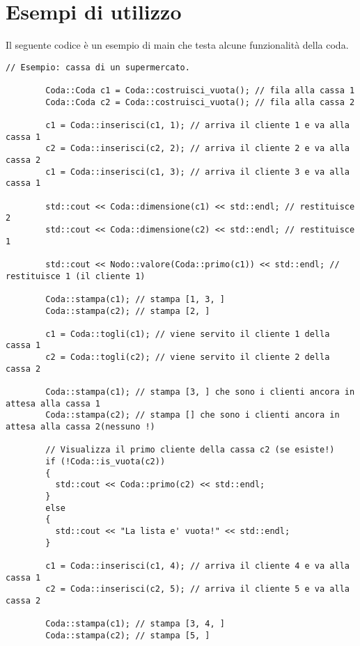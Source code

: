 \documentclass[addpoints,12pt,answers]{exam}
\begin{document}
    \section{Esempi di utilizzo}

    Il seguente codice è un esempio di main che testa
    alcune funzionalità della coda. 
    
    \begin{lstlisting}[style=verbatim]
        // Esempio: cassa di un supermercato.

        Coda::Coda c1 = Coda::costruisci_vuota(); // fila alla cassa 1
        Coda::Coda c2 = Coda::costruisci_vuota(); // fila alla cassa 2

        c1 = Coda::inserisci(c1, 1); // arriva il cliente 1 e va alla cassa 1
        c2 = Coda::inserisci(c2, 2); // arriva il cliente 2 e va alla cassa 2
        c1 = Coda::inserisci(c1, 3); // arriva il cliente 3 e va alla cassa 1

        std::cout << Coda::dimensione(c1) << std::endl; // restituisce 2
        std::cout << Coda::dimensione(c2) << std::endl; // restituisce 1

        std::cout << Nodo::valore(Coda::primo(c1)) << std::endl; // restituisce 1 (il cliente 1)

        Coda::stampa(c1); // stampa [1, 3, ]
        Coda::stampa(c2); // stampa [2, ]

        c1 = Coda::togli(c1); // viene servito il cliente 1 della cassa 1
        c2 = Coda::togli(c2); // viene servito il cliente 2 della cassa 2

        Coda::stampa(c1); // stampa [3, ] che sono i clienti ancora in attesa alla cassa 1
        Coda::stampa(c2); // stampa [] che sono i clienti ancora in attesa alla cassa 2(nessuno !)

        // Visualizza il primo cliente della cassa c2 (se esiste!)
        if (!Coda::is_vuota(c2))
        {
          std::cout << Coda::primo(c2) << std::endl;
        }
        else
        {
          std::cout << "La lista e' vuota!" << std::endl;
        }

        c1 = Coda::inserisci(c1, 4); // arriva il cliente 4 e va alla cassa 1
        c2 = Coda::inserisci(c2, 5); // arriva il cliente 5 e va alla cassa 2

        Coda::stampa(c1); // stampa [3, 4, ]
        Coda::stampa(c2); // stampa [5, ]
    \end{lstlisting}
    
\end{document}
